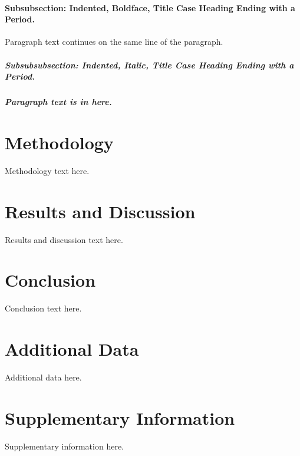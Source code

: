 \documentclass{thesis-dissertation}
\begin{document}
\lipsum[3-4]

\subsubsection{Subsubsection: Indented, Boldface, Title Case Heading Ending with a Period.}
Paragraph text continues on the same line of the paragraph.

\paragraph{Subsubsubsection: Indented, Italic, Title Case Heading Ending with a Period.} \lipsum[5-6]

\paragraph[An alternative]{Paragraph text is in here.} \lipsum[5-6]

\chapter{Methodology}
Methodology text here.

\lipsum[7-8]

\chapter{Results and Discussion}
Results and discussion text here.

\lipsum[9-10]

\chapter{Conclusion}
Conclusion text here.

\lipsum[11-12]

\nocite{*}
\printbibliography

\appendix
\chapter{Additional Data}
Additional data here.
\chapter{Supplementary Information}
Supplementary information here.
\end{document}
